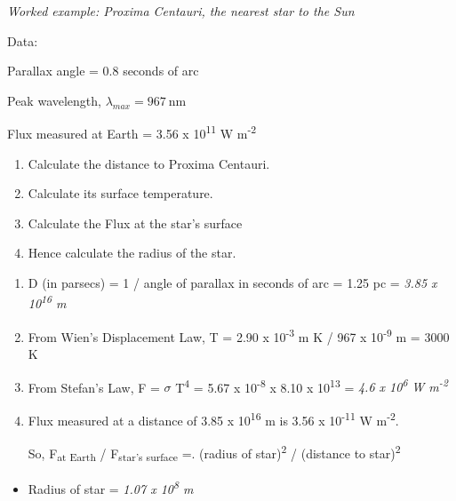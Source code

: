\documentclass[revision-guide.tex]{subfiles}
\begin{document}
\begin{example}
\emph{Worked example: Proxima Centauri, the nearest star to the Sun}

Data:

Parallax angle = 0.8 seconds of arc

Peak wavelength, $\lambda_{max} = \SI{967}{\nano\metre}$

Flux measured at Earth = 3.56 x 10\textsuperscript{11} W
m\textsuperscript{-2}

\begin{enumerate}
\def\labelenumi{\arabic{enumi}.}
\item
  Calculate the distance to Proxima Centauri.
\item
  Calculate its surface temperature.
\item
  Calculate the Flux at the star's surface
\item
  Hence calculate the radius of the star.
\end{enumerate}

\answer

\begin{enumerate}
\def\labelenumi{\arabic{enumi}.}
\item
  D (in parsecs) = 1 / angle of parallax in seconds of arc = 1.25 pc =
  \emph{3.85 x 10\textsuperscript{16} m}
\item
  From Wien's Displacement Law, T = 2.90 x 10\textsuperscript{-3} m K /
  967 x 10\textsuperscript{-9} m = 3000 K
\item
  From Stefan's Law, F = $\sigma$ T\textsuperscript{4} = 5.67 x
  10\textsuperscript{-8} x 8.10 x 10\textsuperscript{13} = \emph{4.6 x
  10\textsuperscript{6} W m\textsuperscript{-2}}
\item
  Flux measured at a distance of 3.85 x 10\textsuperscript{16} m is 3.56
  x 10\textsuperscript{-11} W m\textsuperscript{-2}.

  So, F\textsubscript{at Earth} / F\textsubscript{star's surface} =.
  (radius of star)\textsuperscript{2} / (distance to
  star)\textsuperscript{2}
\end{enumerate}

\begin{itemize}
\item
  Radius of star = \emph{1.07 x 10\textsuperscript{8} m}
\end{itemize}

\end{example}

\end{document}
